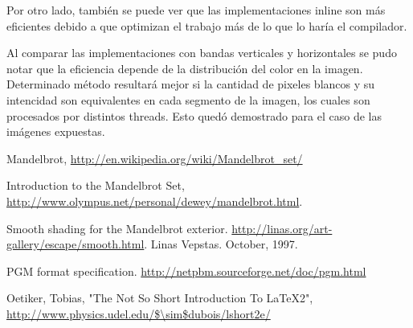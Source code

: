 \documentclass[a4paper,10pt]{article}
\begin{document}
Por otro lado, también se puede ver que las implementaciones inline son más eficientes debido a que optimizan el trabajo más de lo que lo haría el compilador.

Al comparar las implementaciones con bandas verticales y horizontales se pudo notar que la eficiencia depende de la distribución del color en la imagen. Determinado método resultará mejor si la cantidad de pixeles blancos y su intencidad son equivalentes en cada segmento de la imagen, los cuales son procesados por distintos threads. Esto quedó demostrado para el caso de las imágenes expuestas.

\pagebreak

\begin{thebibliography}{99}

 Mandelbrot, \url{http://en.wikipedia.org/wiki/Mandelbrot\_set/}

 Introduction to the Mandelbrot Set,
\url{http://www.olympus.net/personal/dewey/mandelbrot.html}.

 Smooth shading for the Mandelbrot exterior.
\url{http://linas.org/art-gallery/escape/smooth.html}. Linas Vepstas. October, 1997.

 PGM format specification.
\url{http://netpbm.sourceforge.net/doc/pgm.html}

 Oetiker, Tobias, "The Not So Short Introduction To LaTeX2", \url{http://www.physics.udel.edu/$\sim$dubois/lshort2e/}

\end{thebibliography}
\end{document}
